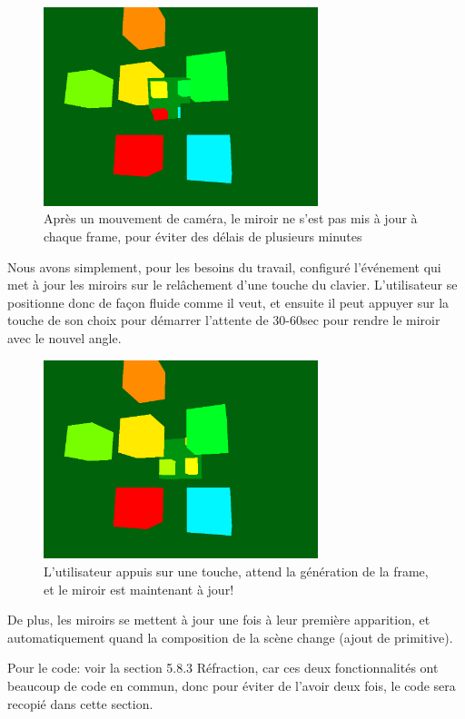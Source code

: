 \begin{figure}[h]
	\centering
	\includegraphics[width=8cm]{fig/CubeReflectionRefreshManuel.png}
	\caption{Après un mouvement de caméra, le miroir ne s'est pas mis à jour à chaque frame, pour éviter des délais de plusieurs minutes}
	\label{fig:propriete}
\end{figure}

\smallskip

Nous avons simplement, pour les besoins du travail, configuré l'événement qui met à jour les miroirs sur le relâchement d'une touche du clavier. L'utilisateur se positionne donc de façon fluide comme il veut, et ensuite il peut appuyer sur la touche de son choix pour démarrer l'attente de 30-60sec pour rendre le miroir avec le nouvel angle.

\begin{figure}[h]
	\centering
	\includegraphics[width=8cm]{fig/CubeReflectionApresRefresh.png}
	\caption{L'utilisateur appuis sur une touche, attend la génération de la frame, et le miroir est maintenant à jour!}
	\label{fig:propriete}
\end{figure}

\bigskip
De plus, les miroirs se mettent à jour une fois à leur première apparition, et automatiquement quand la composition de la scène change (ajout de primitive).

\smallskip

Pour le code: voir la section 5.8.3 Réfraction, car ces deux fonctionnalités ont beaucoup de code en commun, donc pour éviter de l'avoir deux fois, le code sera recopié dans cette section.

